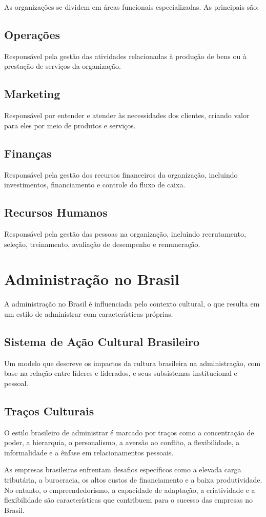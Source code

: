 As organizações se dividem em áreas funcionais especializadas. As principais são:

\subsection{Operações}
Responsável pela gestão das atividades relacionadas à produção de bens ou à prestação de serviços da organização.

\subsection{Marketing}
Responsável por entender e atender às necessidades dos clientes, criando valor para eles por meio de produtos e serviços.

\subsection{Finanças}
Responsável pela gestão dos recursos financeiros da organização, incluindo investimentos, financiamento e controle do fluxo de caixa.

\subsection{Recursos Humanos}
Responsável pela gestão das pessoas na organização, incluindo recrutamento, seleção, treinamento, avaliação de desempenho e remuneração.

\section{Administração no Brasil}

A administração no Brasil é influenciada pelo contexto cultural, o que resulta em um estilo de administrar com características próprias.

\subsection{Sistema de Ação Cultural Brasileiro}
Um modelo que descreve os impactos da cultura brasileira na administração, com base na relação entre líderes e liderados, e seus subsistemas institucional e pessoal.

\subsection{Traços Culturais}
O estilo brasileiro de administrar é marcado por traços como a concentração de poder, a hierarquia, o personalismo, a aversão ao conflito, a flexibilidade, a informalidade e a ênfase em relacionamentos pessoais.

As empresas brasileiras enfrentam desafios específicos como a elevada carga tributária, a burocracia, os altos custos de financiamento e a baixa produtividade. No entanto, o empreendedorismo, a capacidade de adaptação, a criatividade e a flexibilidade são características que contribuem para o sucesso das empresas no Brasil.
